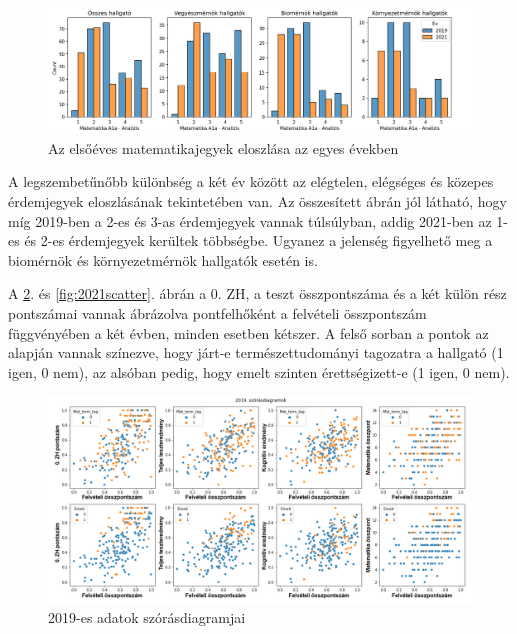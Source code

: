\documentclass[12pt]{article}
\begin{document}
\begin{figure}[H] 
\centering
\includegraphics[width=\textwidth]{kepek/jegyek_eloszlas2.png}
\caption{Az elsőéves matematikajegyek eloszlása az egyes években}
\label{fig:jegyeloszlas}
\end{figure} 

\noindent A legszembetűnőbb különbség a két év között az elégtelen, elégséges és közepes érdemjegyek eloszlásának tekintetében van. Az összesített ábrán jól látható, hogy míg 2019-ben a 2-es és 3-as érdemjegyek vannak túlsúlyban, addig 2021-ben az 1-es és 2-es érdemjegyek kerültek többségbe. Ugyanez a jelenség figyelhető meg a biomérnök és környezetmérnök hallgatók esetén is.

A \ref{fig:2019scatter}. és \ref{fig:2021scatter}. ábrán a 0. ZH, a teszt összpontszáma és a két külön rész pontszámai vannak ábrázolva pontfelhőként a felvételi összpontszám függvényében a két évben, minden esetben kétszer. A felső sorban a pontok az alapján vannak színezve, hogy járt-e természettudományi tagozatra a hallgató (1 igen, 0 nem), az alsóban pedig, hogy emelt szinten érettségizett-e (1 igen, 0 nem).

\begin{figure}[H]
\centering
\includegraphics[width=\textwidth]{kepek/2019scatter.png}
\caption{2019-es adatok szórásdiagramjai}
\label{fig:2019scatter}
\end{figure}
\end{document}
